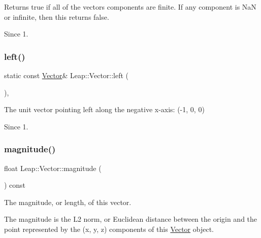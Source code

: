 Returns true if all of the vector\textquotesingle{}s components are finite. If any component is NaN or infinite, then this returns false.


\begin{DoxyCodeInclude}
\end{DoxyCodeInclude}
 \begin{DoxySince}{Since}
1. 
\end{DoxySince}
\mbox{\label{struct_leap_1_1_vector_a315ffbbd7f686e1d93bffc6beb11f89d}} 
\subsubsection{\texorpdfstring{left()}{left()}}
{\footnotesize\ttfamily static const \hyperlink{struct_leap_1_1_vector}{Vector}\& Leap\+::\+Vector\+::left (\begin{DoxyParamCaption}{ }\end{DoxyParamCaption})\hspace{0.3cm}{\ttfamily [inline]}, {\ttfamily [static]}}

The unit vector pointing left along the negative x-\/axis\+: (-\/1, 0, 0)


\begin{DoxyCodeInclude}
\end{DoxyCodeInclude}
 \begin{DoxySince}{Since}
1. 
\end{DoxySince}
\mbox{\label{struct_leap_1_1_vector_a81d1a5007b71022ee3443f2d61be4c3e}} 
\subsubsection{\texorpdfstring{magnitude()}{magnitude()}}
{\footnotesize\ttfamily float Leap\+::\+Vector\+::magnitude (\begin{DoxyParamCaption}{ }\end{DoxyParamCaption}) const\hspace{0.3cm}{\ttfamily [inline]}}

The magnitude, or length, of this vector.

The magnitude is the L2 norm, or Euclidean distance between the origin and the point represented by the (x, y, z) components of this \hyperlink{struct_leap_1_1_vector}{Vector} object.


